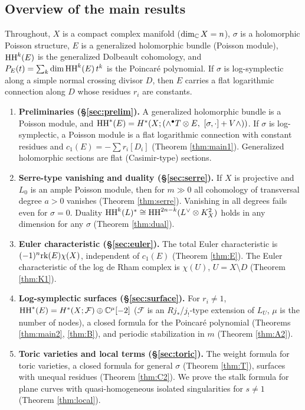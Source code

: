 \subsection{Overview of the main results}
Throughout, $X$ is a compact complex manifold ($\dim_\mathbb C X=n$), $\sigma$ is a holomorphic Poisson structure, $E$ is a generalized holomorphic bundle (Poisson module), $\mathrm{HH}^k(E)$ is the generalized Dolbeault cohomology, and $P_E(t)=\sum_k\dim\mathrm{HH}^k(E)\,t^k$ is the Poincar\'e polynomial. If $\sigma$ is log-symplectic along a simple normal crossing divisor $D$, then $E$ carries a flat logarithmic connection along $D$ whose residues $r_i$ are constants.

\begin{enumerate}
\item[(1)] \textbf{Preliminaries (\S\ref{sec:prelim}).} A generalized holomorphic bundle is a Poisson module, and $\HH^*(E)=H^*(X;(\wedge^\bullet T\otimes E,\ [\sigma,\cdot]+V\wedge))$. If $\sigma$ is log-symplectic, a Poisson module is a flat logarithmic connection with constant residues and $c_1(E)=-\sum r_i[D_i]$ (Theorem \ref{thm:main1}). Generalized holomorphic sections are flat (Casimir-type) sections.
\item[(2)] \textbf{Serre-type vanishing and duality (\S\ref{sec:serre}).} If $X$ is projective and $L_0$ is an ample Poisson module, then for $m\gg0$ all cohomology of transversal degree $a>0$ vanishes (Theorem \ref{thm:serre}). Vanishing in all degrees fails even for $\sigma=0$. Duality $\mathrm{HH}^k(L)^*\cong\mathrm{HH}^{2n-k}(L^\vee\otimes K_X^2)$ holds in any dimension for any $\sigma$ (Theorem \ref{thm:dual}).
\item[(3)] \textbf{Euler characteristic (\S\ref{sec:euler}).} The total Euler characteristic is $(-1)^n\mathrm{rk}(E)\chi(X)$, independent of $c_1(E)$ (Theorem \ref{thm:E}). The Euler characteristic of the log de Rham complex is $\chi(U)$, $U=X\setminus D$ (Theorem \ref{thm:K1}).
\item[(4)] \textbf{Log-symplectic surfaces (\S\ref{sec:surface}).} For $r_i\neq1$, $\mathrm{HH}^*(E)=H^*(X;\mathcal F)\oplus\mathbb C^\mu[-2]$ ($\mathcal F$ is an $Rj_*$/$j_!$-type extension of $L_U$, $\mu$ is the number of nodes), a closed formula for the Poincar\'e polynomial (Theorems \ref{thm:main2}, \ref{thm:B}), and periodic stabilization in $m$ (Theorem \ref{thm:A2}).
\item[(5)] \textbf{Toric varieties and local terms (\S\ref{sec:toric}).} The weight formula for toric varieties, a closed formula for general $\sigma$ (Theorem \ref{thm:T}), surfaces with unequal residues (Theorem \ref{thm:C2}). We prove the stalk formula for plane curves with quasi-homogeneous isolated singularities for $s\neq1$ (Theorem \ref{thm:local}).

\end{enumerate}

